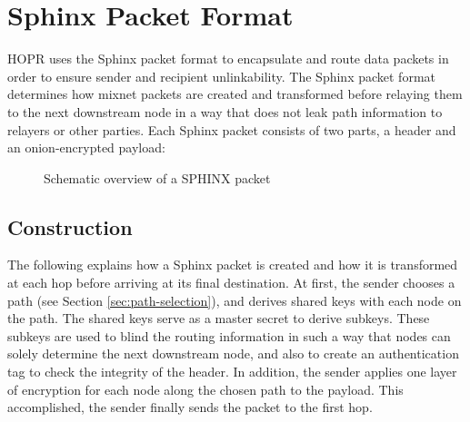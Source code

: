 \section{Sphinx Packet Format}
\label{sec:sphinx}

HOPR uses the Sphinx packet format \cite{sphinxpaper} to encapsulate and route data packets in order to ensure sender and recipient unlinkability. The Sphinx packet format determines how mixnet packets are created and transformed before relaying them to the next downstream node in a way that does not leak path information to relayers or other parties. Each Sphinx packet consists of two parts, a header and an onion-encrypted payload:

\begin{figure}[H]
    \centering
    \label{fig:sphinxoverview}
    \caption{Schematic overview of a SPHINX packet}
\end{figure}

\subsection{Construction}

The following explains how a Sphinx packet is created and how it is transformed at each hop before arriving at its final destination. At first, the sender chooses a path (see Section \ref{sec:path-selection}), and derives shared keys with each node on the path. The shared keys serve as a master secret to derive subkeys. These subkeys are used to blind the routing information in such a way that nodes can solely determine the next downstream node, and also to create an authentication tag to check the integrity of the header. In addition, the sender applies one layer of encryption for each node along the chosen path to the payload. This accomplished, the sender finally sends the packet to the first hop.

